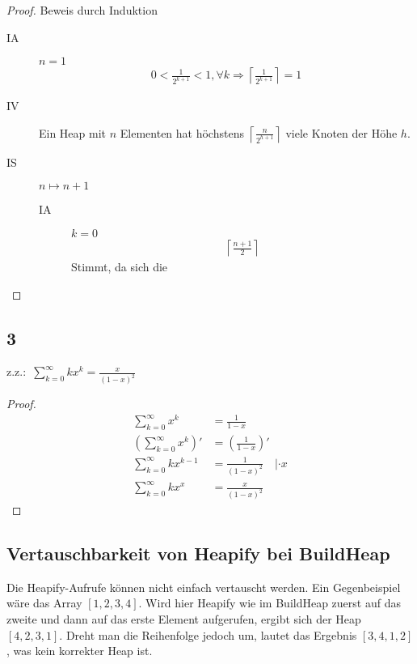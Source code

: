 \documentclass[a4paper]{article}
\newcommand{\ceil}[1]{\left\lceil{}{#1}\right\rceil}
\begin{document}
    \begin{proof} Beweis durch Induktion

        \begin{description}
            \item[IA] $n = 1$
            \begin{gather*}
                0 < \frac{1}{2^{k + 1}} < 1, \forall k \Rightarrow \ceil{\frac{1}{2^{k + 1}}} = 1
            \end{gather*}
            \item[IV] Ein Heap mit $n$ Elementen hat höchstens $\ceil{\frac{n}{2^{h+1}}}$ viele Knoten der Höhe $h$.
            \item[IS] $n \longmapsto n + 1$
            \begin{description}
                \item[IA] $k = 0$
                \begin{gather*}
                    \ceil{\frac{n + 1}{2}}
                \end{gather*}
                Stimmt, da sich die
            \end{description}
        \end{description}
    \end{proof}

    \subsection*{3}
    \label{subsec:aufgabe2_3}
    z.z.:~$\sum_{k=0}^{\infty}{k x^k} = \frac{x}{(1 - x)^2}$

    \begin{proof}
        \begin{align*}
            \sum_{k=0}^{\infty}{x^k} &= \frac{1}{1 - x} \\
            \left( \sum_{k=0}^{\infty}{x^k} \right)' &= \left( \frac{1}{1 - x} \right)' \\
            \sum_{k=0}^{\infty}{k x^{k-1}} &= \frac{1}{(1 - x)^2} \quad | \cdot x \\
            \sum_{k=0}^{\infty}{k x^x} &= \frac{x}{(1 - x)^2}
        \end{align*}
    \end{proof}

    \subsection*{Vertauschbarkeit von Heapify bei BuildHeap}
    Die Heapify-Aufrufe können nicht einfach vertauscht werden.
    Ein Gegenbeispiel wäre das Array $[1, 2, 3, 4]$.
    Wird hier Heapify wie im BuildHeap zuerst auf das zweite und dann auf das erste Element aufgerufen, ergibt sich der Heap $[4, 2, 3, 1]$.
    Dreht man die Reihenfolge jedoch um, lautet das Ergebnis $[3, 4, 1, 2]$, was kein korrekter Heap ist.
\end{document}
